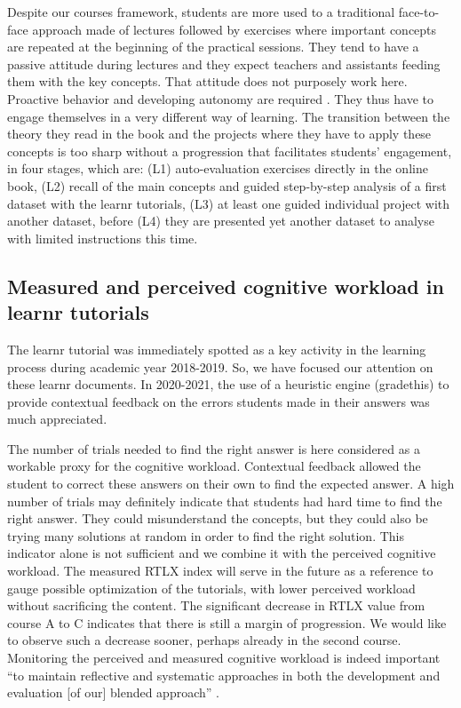 \documentclass{aims}
\theoremstyle{definition}
\begin{document}
Despite our courses framework, students are more used to a traditional
face-to-face approach made of lectures followed by exercises where
important concepts are repeated at the beginning of the practical
sessions. They tend to have a passive attitude during lectures and they
expect teachers and assistants feeding them with the key concepts. That
attitude does not purposely work here. Proactive behavior and developing
autonomy are required \cite{Freeman2014}. They thus have to engage
themselves in a very different way of learning. The transition between
the theory they read in the book and the projects where they have to
apply these concepts is too sharp without a progression that facilitates
students' engagement, in four stages, which are: (L1) auto-evaluation
exercises directly in the online book, (L2) recall of the main concepts
and guided step-by-step analysis of a first dataset with the learnr
tutorials, (L3) at least one guided individual project with another
dataset, before (L4) they are presented yet another dataset to analyse
with limited instructions this time.

\hypertarget{measured-and-perceived-cognitive-workload-in-learnr-tutorials-2}{%
\subsection{Measured and perceived cognitive workload in learnr
tutorials}\label{measured-and-perceived-cognitive-workload-in-learnr-tutorials-2}}

The learnr tutorial was immediately spotted as a key activity in the
learning process during academic year 2018-2019. So, we have focused our
attention on these learnr documents. In 2020-2021, the use of a
heuristic engine (gradethis) to provide contextual feedback on the
errors students made in their answers was much appreciated.

The number of trials needed to find the right answer is here considered
as a workable proxy for the cognitive workload. Contextual feedback
allowed the student to correct these answers on their own to find the
expected answer. A high number of trials may definitely indicate that
students had hard time to find the right answer. They could
misunderstand the concepts, but they could also be trying many solutions
at random in order to find the right solution. This indicator alone is
not sufficient and we combine it with the perceived cognitive workload.
The measured RTLX index will serve in the future as a reference to gauge
possible optimization of the tutorials, with lower perceived workload
without sacrificing the content. The significant decrease in RTLX value
from course A to C indicates that there is still a margin of
progression. We would like to observe such a decrease sooner, perhaps
already in the second course. Monitoring the perceived and measured
cognitive workload is indeed important ``to maintain reflective and
systematic approaches in both the development and evaluation {[}of
our{]} blended approach'' \cite{Spadafora2018}.
\end{document}
